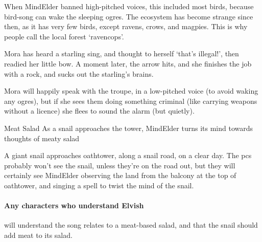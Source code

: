 
\begin{exampletext}
  When \gls{MindElder} banned high-pitched voices, this included most birds, because bird-song can wake the sleeping ogres.
  The ecosystem has become strange since then, as it has very few birds, except ravens, crows, and magpies.
  This is why people call the local forest `\gls{ravencops}'.
\end{exampletext}

Mora has heard a starling sing, and thought to herself `that's illegal!', then readied her little bow.
A moment later, the arrow hits, and she finishes the job with a rock, and sucks out the starling's brains.

Mora will happily speak with the troupe, in a low-pitched voice (to avoid waking any ogres), but if she sees them doing something criminal (like carrying weapons without a licence) she flees to sound the alarm (but quietly).

{Meat Salad}%
{As a snail approaches the tower, \gls{MindElder} turns its mind towards thoughts of meaty salad}%


A giant snail approaches \gls{oathtower}, along a snail road, on a clear day.
The \glspl{pc} probably won't see the snail, unless they're on the road out, but they will certainly see \gls{MindElder} observing the land from the balcony at the top of \gls{oathtower}, and singing a spell to twist the mind of the snail.

\paragraph{Any characters who understand Elvish}
will understand the song relates to a meat-based salad, and that the snail should add meat to its salad.

